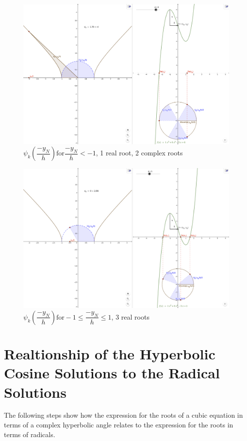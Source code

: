 \documentclass{article}
\begin{document}
\begin{figure}[h]
	\includegraphics[width=\linewidth]{cubic_figure1.png}
	\caption{\mbox{$\psi_k\left(\dfrac{-y_N}{h}\right) \mathrm{ for } \dfrac{-y_N}{h} < -1$}, 1 real root, 2 complex roots} 
	\label{fig:angle1}
\end{figure}

\begin{figure}[h]
	\includegraphics[width=\linewidth]{cubic_figure2.png}
	\caption{\mbox{$\psi_k\left(\dfrac{-y_N}{h}\right) \mathrm{ for } -1 \le \dfrac{-y_N}{h} \le 1$}, 3 real roots} 
	\label{fig:angle2}
\end{figure}

\clearpage
\section{Realtionship of the Hyperbolic Cosine Solutions to the Radical Solutions}
The following steps show how the expression for the roots of a cubic equation in terms of a complex hyperbolic angle relates to the expression for the roots in terms of radicals.
\end{document}
